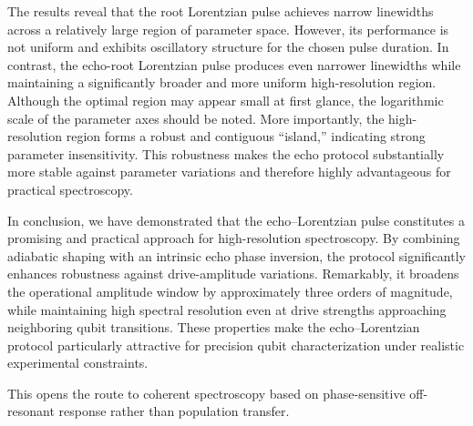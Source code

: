 The results reveal that the root Lorentzian pulse achieves narrow linewidths across a relatively large region of parameter space. However, its performance is not uniform and exhibits oscillatory structure for the chosen pulse duration. In contrast, the echo-root Lorentzian pulse produces even narrower linewidths while maintaining a significantly broader and more uniform high-resolution region. Although the optimal region may appear small at first glance, the logarithmic scale of the parameter axes should be noted. More importantly, the high-resolution region forms a robust and contiguous “island,” indicating strong parameter insensitivity. This robustness makes the echo protocol substantially more stable against parameter variations and therefore highly advantageous for practical spectroscopy.


In conclusion, we have demonstrated that the echo–Lorentzian pulse constitutes a promising and practical approach for high-resolution spectroscopy. By combining adiabatic shaping with an intrinsic echo phase inversion, the protocol significantly enhances robustness against drive-amplitude variations. Remarkably, it broadens the operational amplitude window by approximately three orders of magnitude, while maintaining high spectral resolution even at drive strengths approaching neighboring qubit transitions. These properties make the echo–Lorentzian protocol particularly attractive for precision qubit characterization under realistic experimental constraints.

This opens the route to coherent spectroscopy based on phase-sensitive off-resonant response rather than population transfer.









